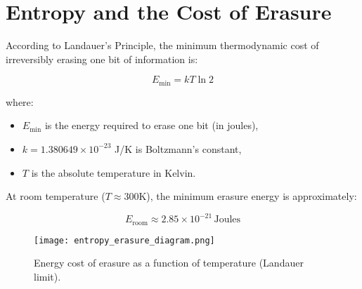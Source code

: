 \documentclass{article}
\begin{document}
\section*{Entropy and the Cost of Erasure}

According to Landauer's Principle, the minimum thermodynamic cost of irreversibly erasing one bit of information is:

\begin{equation}
E_{\text{min}} = k T \ln 2
\end{equation}

\noindent where:
\begin{itemize}
  \item $E_{\text{min}}$ is the energy required to erase one bit (in joules),
  \item $k = 1.380649 \times 10^{-23}$ J/K is Boltzmann's constant,
  \item $T$ is the absolute temperature in Kelvin.
\end{itemize}

At room temperature ($T \approx 300$K), the minimum erasure energy is approximately:

\begin{equation}
E_{\text{room}} \approx 2.85 \times 10^{-21} \, \text{Joules}
\end{equation}

\begin{figure}[h!]
  \centering
  \texttt{[image: entropy\_erasure\_diagram.png]}
  \caption{Energy cost of erasure as a function of temperature (Landauer limit).}
\end{figure}
\end{document}
